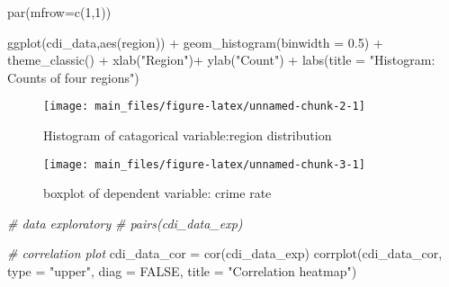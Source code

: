 \documentclass[
  11pt,
]{article}
\newenvironment{Shaded}{\begin{snugshade}}{\end{snugshade}}
\newcommand{\AttributeTok}[1]{\textcolor[rgb]{0.77,0.63,0.00}{#1}}
\newcommand{\CommentTok}[1]{\textcolor[rgb]{0.56,0.35,0.01}{\textit{#1}}}
\newcommand{\ConstantTok}[1]{\textcolor[rgb]{0.00,0.00,0.00}{#1}}
\newcommand{\DecValTok}[1]{\textcolor[rgb]{0.00,0.00,0.81}{#1}}
\newcommand{\FloatTok}[1]{\textcolor[rgb]{0.00,0.00,0.81}{#1}}
\newcommand{\FunctionTok}[1]{\textcolor[rgb]{0.00,0.00,0.00}{#1}}
\newcommand{\NormalTok}[1]{#1}
\newcommand{\OtherTok}[1]{\textcolor[rgb]{0.56,0.35,0.01}{#1}}
\newcommand{\SpecialCharTok}[1]{\textcolor[rgb]{0.00,0.00,0.00}{#1}}
\newcommand{\StringTok}[1]{\textcolor[rgb]{0.31,0.60,0.02}{#1}}
\begin{document}
\begin{Shaded}
\begin{Highlighting}[]
\FunctionTok{par}\NormalTok{(}\AttributeTok{mfrow=}\FunctionTok{c}\NormalTok{(}\DecValTok{1}\NormalTok{,}\DecValTok{1}\NormalTok{))}

\FunctionTok{ggplot}\NormalTok{(cdi\_data,}\FunctionTok{aes}\NormalTok{(region)) }\SpecialCharTok{+} 
  \FunctionTok{geom\_histogram}\NormalTok{(}\AttributeTok{binwidth =} \FloatTok{0.5}\NormalTok{) }\SpecialCharTok{+}
  \FunctionTok{theme\_classic}\NormalTok{() }\SpecialCharTok{+}
  \FunctionTok{xlab}\NormalTok{(}\StringTok{"Region"}\NormalTok{)}\SpecialCharTok{+}
  \FunctionTok{ylab}\NormalTok{(}\StringTok{"Count"}\NormalTok{) }\SpecialCharTok{+}
  \FunctionTok{labs}\NormalTok{(}\AttributeTok{title =} \StringTok{"Histogram: Counts of four regions"}\NormalTok{)}
\end{Highlighting}
\end{Shaded}

\begin{figure}
\texttt{[image: main\_files/figure-latex/unnamed-chunk-2-1]} \caption{\label{fig:figs}Histogram of catagorical variable:region distribution}\label{fig:unnamed-chunk-2}
\end{figure}

\begin{Shaded}
\end{Shaded}

\begin{figure}
\texttt{[image: main\_files/figure-latex/unnamed-chunk-3-1]} \caption{\label{fig:figs}boxplot of dependent variable: crime rate}\label{fig:unnamed-chunk-3}
\end{figure}

\begin{Shaded}
\begin{Highlighting}[]
\CommentTok{\# data exploratory}
\CommentTok{\# pairs(cdi\_data\_exp)}
\end{Highlighting}
\end{Shaded}

\begin{Shaded}
\begin{Highlighting}[]
\CommentTok{\# correlation plot}
\NormalTok{cdi\_data\_cor }\OtherTok{=} \FunctionTok{cor}\NormalTok{(cdi\_data\_exp)}
\FunctionTok{corrplot}\NormalTok{(cdi\_data\_cor, }\AttributeTok{type =} \StringTok{"upper"}\NormalTok{, }\AttributeTok{diag =} \ConstantTok{FALSE}\NormalTok{, }\AttributeTok{title =} \StringTok{"Correlation heatmap"}\NormalTok{)}
\end{Highlighting}
\end{Shaded}
\end{document}
